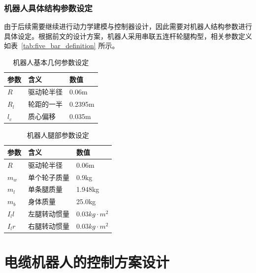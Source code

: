 \documentclass[
  oneside,
  degree=bachelor,
  fullwidthstop=false,
  fontset=fandol,
  times=false,
  minted=true,
  biblatex=true,
]{tongjithesis}
\begin{document}
\subsection{机器人具体结构参数设定}
由于后续需要继续进行动力学建模与控制器设计，因此需要对机器人结构参数进行具体设定。根据前文的设计方案，机器人采用串联五连杆轮腿构型，相关参数定义如表~\ref{tab:five_bar_definition} 所示。

\begin{table}[htbp]
  \centering
  \caption{机器人基本几何参数设定}\label{tab:geometry_params}
  \renewcommand{\arraystretch}{1.3}
  \begin{tabularx}{\textwidth}{>{\centering\arraybackslash}X >{\centering\arraybackslash}X >{\centering\arraybackslash}X}
    \toprule
    \textbf{参数} & \textbf{含义} & \textbf{数值} \\
    \midrule
    $R$ & 驱动轮半径 & 0.06m \\
    $R_l$ & 轮距的一半 & 0.2395m \\
    $l_c$ & 质心偏移 & 0.035m \\
    \bottomrule
  \end{tabularx}
\end{table}

\begin{table}[H]
  \centering
  \caption{机器人腿部参数设定}\label{tab:leg_params}
  \renewcommand{\arraystretch}{1.3}
  \begin{tabularx}{\textwidth}{>{\centering\arraybackslash}X >{\centering\arraybackslash}X >{\centering\arraybackslash}X}
    \toprule
    \textbf{参数} & \textbf{含义} & \textbf{数值} \\
    \midrule
    $R$ & 驱动轮半径 & 0.06m \\
    $m_w$ & 单个轮子质量 & 0.9kg \\
    $m_l$ & 单条腿质量 & 1.948kg \\
    $m_b$ & 身体质量 & 25.0kg \\
    $I_ll$ & 左腿转动惯量 &$0.03kg\cdot m^2$\\
    $I_lr$ & 右腿转动惯量 &$0.03kg\cdot m^2$\\
    \bottomrule
  \end{tabularx}
\end{table}
\chapter{电缆机器人的控制方案设计}\label{chap:control}
\end{document}

